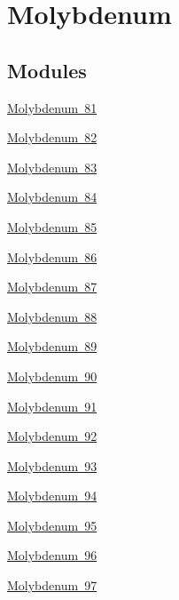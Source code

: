 \hypertarget{group___isotope_const-_molybdenum}{}\section{Molybdenum}
\label{group___isotope_const-_molybdenum}
\subsection*{Modules}
\begin{DoxyCompactItemize}
\item 
\mbox{\hyperlink{group___isotope_const-_molybdenum-_mo81}{Molybdenum 81}}
\item 
\mbox{\hyperlink{group___isotope_const-_molybdenum-_mo82}{Molybdenum 82}}
\item 
\mbox{\hyperlink{group___isotope_const-_molybdenum-_mo83}{Molybdenum 83}}
\item 
\mbox{\hyperlink{group___isotope_const-_molybdenum-_mo84}{Molybdenum 84}}
\item 
\mbox{\hyperlink{group___isotope_const-_molybdenum-_mo85}{Molybdenum 85}}
\item 
\mbox{\hyperlink{group___isotope_const-_molybdenum-_mo86}{Molybdenum 86}}
\item 
\mbox{\hyperlink{group___isotope_const-_molybdenum-_mo87}{Molybdenum 87}}
\item 
\mbox{\hyperlink{group___isotope_const-_molybdenum-_mo88}{Molybdenum 88}}
\item 
\mbox{\hyperlink{group___isotope_const-_molybdenum-_mo89}{Molybdenum 89}}
\item 
\mbox{\hyperlink{group___isotope_const-_molybdenum-_mo90}{Molybdenum 90}}
\item 
\mbox{\hyperlink{group___isotope_const-_molybdenum-_mo91}{Molybdenum 91}}
\item 
\mbox{\hyperlink{group___isotope_const-_molybdenum-_mo92}{Molybdenum 92}}
\item 
\mbox{\hyperlink{group___isotope_const-_molybdenum-_mo93}{Molybdenum 93}}
\item 
\mbox{\hyperlink{group___isotope_const-_molybdenum-_mo94}{Molybdenum 94}}
\item 
\mbox{\hyperlink{group___isotope_const-_molybdenum-_mo95}{Molybdenum 95}}
\item 
\mbox{\hyperlink{group___isotope_const-_molybdenum-_mo96}{Molybdenum 96}}
\item 
\mbox{\hyperlink{group___isotope_const-_molybdenum-_mo97}{Molybdenum 97}}

\end{DoxyCompactItemize}
